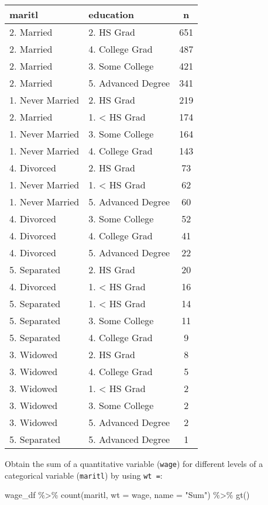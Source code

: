 \documentclass[
]{book}
\newenvironment{Shaded}{\begin{snugshade}}{\end{snugshade}}
\newcommand{\AttributeTok}[1]{\textcolor[rgb]{0.77,0.63,0.00}{#1}}
\newcommand{\FunctionTok}[1]{\textcolor[rgb]{0.00,0.00,0.00}{#1}}
\newcommand{\NormalTok}[1]{#1}
\newcommand{\SpecialCharTok}[1]{\textcolor[rgb]{0.00,0.00,0.00}{#1}}
\newcommand{\StringTok}[1]{\textcolor[rgb]{0.31,0.60,0.02}{#1}}
\begin{document}
\captionsetup[table]{labelformat=empty,skip=1pt}
\begin{longtable}{llc}
\toprule
maritl & education & n \\ 
\midrule
2. Married & 2. HS Grad & 651 \\ 
2. Married & 4. College Grad & 487 \\ 
2. Married & 3. Some College & 421 \\ 
2. Married & 5. Advanced Degree & 341 \\ 
1. Never Married & 2. HS Grad & 219 \\ 
2. Married & 1. < HS Grad & 174 \\ 
1. Never Married & 3. Some College & 164 \\ 
1. Never Married & 4. College Grad & 143 \\ 
4. Divorced & 2. HS Grad & 73 \\ 
1. Never Married & 1. < HS Grad & 62 \\ 
1. Never Married & 5. Advanced Degree & 60 \\ 
4. Divorced & 3. Some College & 52 \\ 
4. Divorced & 4. College Grad & 41 \\ 
4. Divorced & 5. Advanced Degree & 22 \\ 
5. Separated & 2. HS Grad & 20 \\ 
4. Divorced & 1. < HS Grad & 16 \\ 
5. Separated & 1. < HS Grad & 14 \\ 
5. Separated & 3. Some College & 11 \\ 
5. Separated & 4. College Grad & 9 \\ 
3. Widowed & 2. HS Grad & 8 \\ 
3. Widowed & 4. College Grad & 5 \\ 
3. Widowed & 1. < HS Grad & 2 \\ 
3. Widowed & 3. Some College & 2 \\ 
3. Widowed & 5. Advanced Degree & 2 \\ 
5. Separated & 5. Advanced Degree & 1 \\ 
\bottomrule
\end{longtable}

Obtain the sum of a quantitative variable (\texttt{wage}) for different levels of a categorical variable (\texttt{maritl}) by using \texttt{wt\ =}:

\begin{Shaded}
\begin{Highlighting}[]
\NormalTok{wage\_df }\SpecialCharTok{\%\textgreater{}\%}  
  \FunctionTok{count}\NormalTok{(maritl,}
        \AttributeTok{wt =}\NormalTok{ wage,}
        \AttributeTok{name =} \StringTok{"Sum"}\NormalTok{) }\SpecialCharTok{\%\textgreater{}\%} 
  \FunctionTok{gt}\NormalTok{()}
\end{Highlighting}
\end{Shaded}
\end{document}
